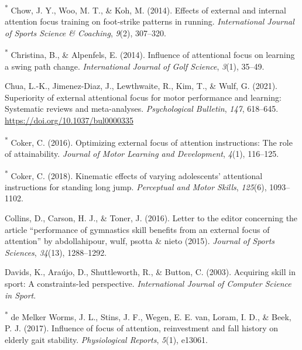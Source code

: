 \documentclass[
  man, donotrepeattitle,floatsintext]{apa7}
\newlength{\cslhangindent}
\newlength{\cslentryspacingunit} %
\newenvironment{CSLReferences}[2] %
 {%
  \setlength{\parindent}{0pt}
  \ifodd #1
  \let\oldpar\par
  \def\par{\hangindent=\cslhangindent\oldpar}
  \fi
  \setlength{\parskip}{#2\cslentryspacingunit}
 }%
 {}
\begin{document}
\begin{CSLReferences}{1}{0}
\leavevmode{}%
\textsuperscript{*} Chow, J. Y., Woo, M. T., \& Koh, M. (2014). Effects of external and internal attention focus training on foot-strike patterns in running. \emph{International Journal of Sports Science \& Coaching}, \emph{9}(2), 307--320.

\leavevmode{}%
\textsuperscript{*} Christina, B., \& Alpenfels, E. (2014). Influence of attentional focus on learning a swing path change. \emph{International Journal of Golf Science}, \emph{3}(1), 35--49.

\leavevmode{}%
Chua, L.-K., Jimenez-Diaz, J., Lewthwaite, R., Kim, T., \& Wulf, G. (2021). Superiority of external attentional focus for motor performance and learning: {Systematic} reviews and meta-analyses. \emph{Psychological Bulletin}, \emph{147}, 618--645. \url{https://doi.org/10.1037/bul0000335}

\leavevmode{}%
\textsuperscript{*} Coker, C. (2016). Optimizing external focus of attention instructions: The role of attainability. \emph{Journal of Motor Learning and Development}, \emph{4}(1), 116--125.

\leavevmode{}%
\textsuperscript{*} Coker, C. (2018). Kinematic effects of varying adolescents' attentional instructions for standing long jump. \emph{Perceptual and Motor Skills}, \emph{125}(6), 1093--1102.

\leavevmode{}%
Collins, D., Carson, H. J., \& Toner, J. (2016). Letter to the editor concerning the article {``performance of gymnastics skill benefits from an external focus of attention''} by abdollahipour, wulf, psotta \& nieto (2015). \emph{Journal of Sports Sciences}, \emph{34}(13), 1288--1292.

\leavevmode{}%
Davids, K., Araújo, D., Shuttleworth, R., \& Button, C. (2003). Acquiring skill in sport: {A} constraints-led perspective. \emph{International Journal of Computer Science in Sport}.

\leavevmode{}%
\textsuperscript{*} de Melker Worms, J. L., Stins, J. F., Wegen, E. E. van, Loram, I. D., \& Beek, P. J. (2017). Influence of focus of attention, reinvestment and fall history on elderly gait stability. \emph{Physiological Reports}, \emph{5}(1), e13061.


\end{CSLReferences}
\end{document}
